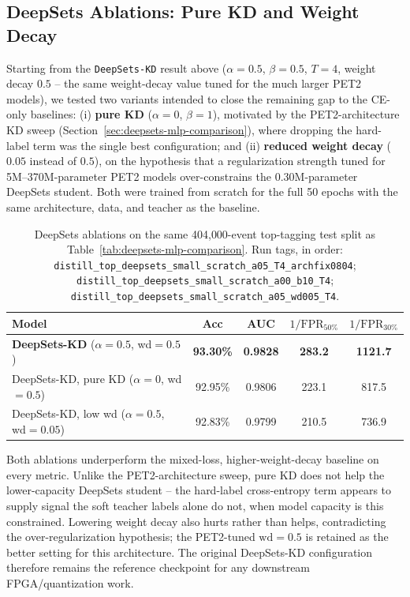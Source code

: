 \subsection{DeepSets Ablations: Pure KD and Weight Decay}
\label{sec:deepsets-ablations}

Starting from the \texttt{DeepSets-KD} result above ($\alpha=0.5$,
$\beta=0.5$, $T=4$, weight decay $0.5$ -- the same weight-decay value tuned
for the much larger PET2 models), we tested two variants intended to close
the remaining gap to the CE-only baselines: (i) \textbf{pure KD}
($\alpha=0$, $\beta=1$), motivated by the PET2-architecture KD sweep
(Section~\ref{sec:deepsets-mlp-comparison}), where dropping the hard-label
term was the single best configuration; and (ii) \textbf{reduced weight
decay} ($0.05$ instead of $0.5$), on the hypothesis that a regularization
strength tuned for 5M--370M-parameter PET2 models over-constrains the
0.30M-parameter DeepSets student. Both were trained from scratch for the
full 50 epochs with the same architecture, data, and teacher as the
baseline.

\begin{table}[h]
    \centering
    \small
    \begin{tabular}{lcccc}
        \toprule
        Model & Acc & AUC & $1/\mathrm{FPR}_{50\%}$ & $1/\mathrm{FPR}_{30\%}$ \\
        \midrule
        \textbf{DeepSets-KD} ($\alpha{=}0.5$, wd$=0.5$) & \textbf{93.30\%} & \textbf{0.9828} & \textbf{283.2} & \textbf{1121.7} \\
        DeepSets-KD, pure KD ($\alpha{=}0$, wd$=0.5$)   & 92.95\% & 0.9806 & 223.1 & 817.5 \\
        DeepSets-KD, low wd ($\alpha{=}0.5$, wd$=0.05$) & 92.83\% & 0.9799 & 210.5 & 736.9 \\
        \bottomrule
    \end{tabular}
    \caption{DeepSets ablations on the same 404{,}000-event top-tagging test
    split as Table~\ref{tab:deepsets-mlp-comparison}. Run tags, in order:
    \texttt{distill\_top\_deepsets\_small\_scratch\_a05\_T4\_archfix0804};
    \texttt{distill\_top\_deepsets\_small\_scratch\_a00\_b10\_T4};
    \texttt{distill\_top\_deepsets\_small\_scratch\_a05\_wd005\_T4}.}
    \label{tab:deepsets-ablations}
\end{table}

Both ablations underperform the mixed-loss, higher-weight-decay baseline on
every metric. Unlike the PET2-architecture sweep, pure KD does not help the
lower-capacity DeepSets student -- the hard-label cross-entropy term
appears to supply signal the soft teacher labels alone do not, when model
capacity is this constrained. Lowering weight decay also hurts rather than
helps, contradicting the over-regularization hypothesis; the PET2-tuned
$\mathrm{wd}=0.5$ is retained as the better setting for this architecture.
The original DeepSets-KD configuration therefore remains the reference
checkpoint for any downstream FPGA/quantization work.


